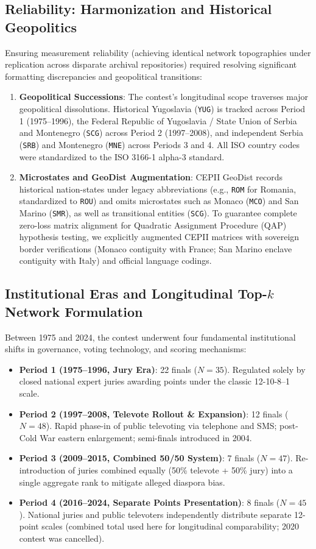 \subsection{Reliability: Harmonization and Historical Geopolitics}
Ensuring measurement reliability (achieving identical network topographies under replication across disparate archival repositories) required resolving significant formatting discrepancies and geopolitical transitions:
\begin{enumerate}
    \item \textbf{Geopolitical Successions}: The contest's longitudinal scope traverses major geopolitical dissolutions. Historical Yugoslavia (\texttt{YUG}) is tracked across Period 1 (1975--1996), the Federal Republic of Yugoslavia / State Union of Serbia and Montenegro (\texttt{SCG}) across Period 2 (1997--2008), and independent Serbia (\texttt{SRB}) and Montenegro (\texttt{MNE}) across Periods 3 and 4. All ISO country codes were standardized to the ISO 3166-1 alpha-3 standard.
    \item \textbf{Microstates and GeoDist Augmentation}: CEPII GeoDist records historical nation-states under legacy abbreviations (e.g., \texttt{ROM} for Romania, standardized to \texttt{ROU}) and omits microstates such as Monaco (\texttt{MCO}) and San Marino (\texttt{SMR}), as well as transitional entities (\texttt{SCG}). To guarantee complete zero-loss matrix alignment for Quadratic Assignment Procedure (QAP) hypothesis testing, we explicitly augmented CEPII matrices with sovereign border verifications (Monaco contiguity with France; San Marino enclave contiguity with Italy) and official language codings.
\end{enumerate}

\subsection{Institutional Eras and Longitudinal Top-$k$ Network Formulation}
Between 1975 and 2024, the contest underwent four fundamental institutional shifts in governance, voting technology, and scoring mechanisms:
\begin{itemize}
    \item \textbf{Period 1 (1975--1996, Jury Era)}: 22 finals ($N=35$). Regulated solely by closed national expert juries awarding points under the classic 12-10-8--1 scale.
    \item \textbf{Period 2 (1997--2008, Televote Rollout \& Expansion)}: 12 finals ($N=48$). Rapid phase-in of public televoting via telephone and SMS; post-Cold War eastern enlargement; semi-finals introduced in 2004.
    \item \textbf{Period 3 (2009--2015, Combined 50/50 System)}: 7 finals ($N=47$). Re-introduction of juries combined equally (50\% televote + 50\% jury) into a single aggregate rank to mitigate alleged diaspora bias.
    \item \textbf{Period 4 (2016--2024, Separate Points Presentation)}: 8 finals ($N=45$). National juries and public televoters independently distribute separate 12-point scales (combined total used here for longitudinal comparability; 2020 contest was cancelled).
\end{itemize}

